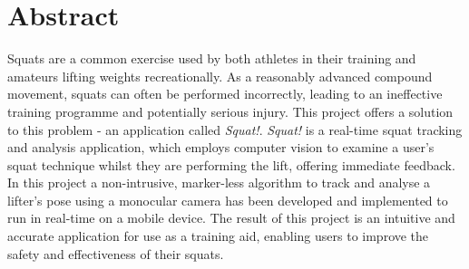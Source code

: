 \vspace*{4cm}
\section*{Abstract}

Squats are a common exercise used by both athletes in their training and amateurs lifting weights recreationally. As a reasonably advanced compound movement, squats can often be performed incorrectly, leading to an ineffective training programme and potentially serious injury. This project offers a solution to this problem - an application called \emph{Squat!}. \emph{Squat!} is a real-time squat tracking and analysis application, which employs computer vision to examine a user's squat technique whilst they are performing the lift, offering immediate feedback. In this project a non-intrusive, marker-less algorithm to track and analyse a lifter's pose using a monocular camera has been developed and implemented to run in real-time on a mobile device. The result of this project is an intuitive and accurate application for use as a training aid, enabling users to improve the safety and effectiveness of their squats.
